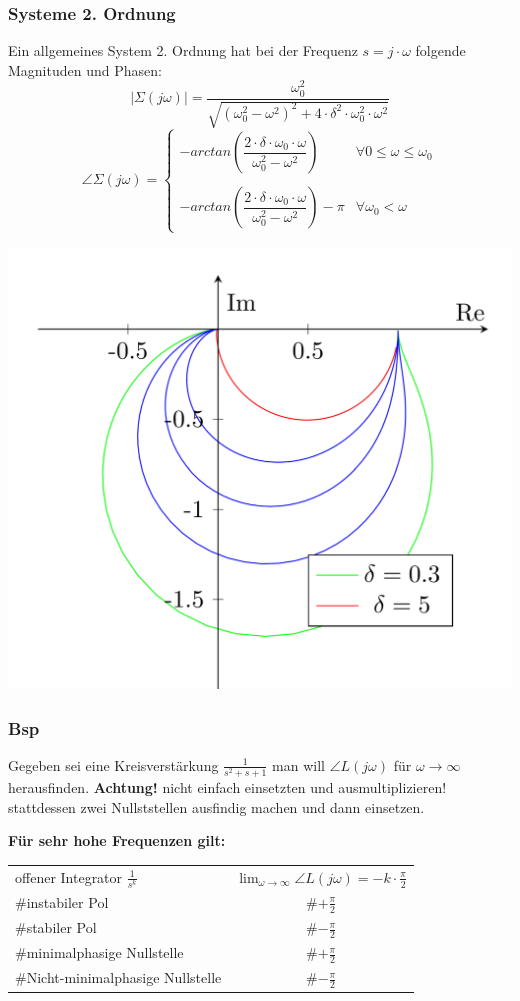         \subsubsection{Systeme 2. Ordnung}
            Ein allgemeines System 2. Ordnung hat bei der Frequenz $s=j\cdot\omega$ folgende Magnituden und Phasen:
            \[ |\Sigma(j\omega)| = \frac{\omega_0^2}{\sqrt{(\omega_0^2-\omega^2)^2+4\cdot \delta^2 \cdot \omega_0^2\cdot \omega^2}}\]
            \[
            \angle\Sigma(j\omega) = \begin{cases} -arctan(\dfrac{2\cdot\delta\cdot\omega_0\cdot\omega}{\omega_0^2-\omega^2}) & \forall 0 \leq \omega \leq\omega_0 \\
            \\  
            -arctan(\dfrac{2\cdot\delta\cdot\omega_0\cdot\omega}{\omega_0^2-\omega^2}) -\pi & \forall \omega_0 < \omega
            
            \end{cases}
            \]
            \begin{center}
                \includegraphics[width = 0.5\linewidth]{images/05/Nyq_2Ordnung.jpg}
            \end{center}

        \subsubsection{Bsp}
            Gegeben sei eine Kreisverstärkung $\frac{1}{s^2+s+1}$
            man will $\angle L(j\omega)$ für $\omega \rightarrow \infty$ herausfinden.
            \textbf{Achtung!} nicht einfach einsetzten und ausmultiplizieren! stattdessen zwei Nullststellen ausfindig machen und dann einsetzen. 
            
            \textbf{Für sehr hohe Frequenzen gilt:}
            \begin{center}
                \renewcommand{\arraystretch}{1.3}{\begin{tabular}{l|c}
                  offener Integrator $\frac{1}{s^k}$   & $\displaystyle\lim_{\omega\to\infty}\angle L(j\omega)= -k\cdot \frac{\pi}{2}$ \\
                   \#instabiler Pol   & \#$+\frac{\pi}{2}$ \\
                   \#stabiler Pol & \#$-\frac{\pi}{2}$\\
                   \#minimalphasige Nullstelle &   \#$+\frac{\pi}{2}$\\
                   \#Nicht-minimalphasige Nullstelle & \#$-\frac{\pi}{2}$
                \end{tabular}}
            \end{center}
        

